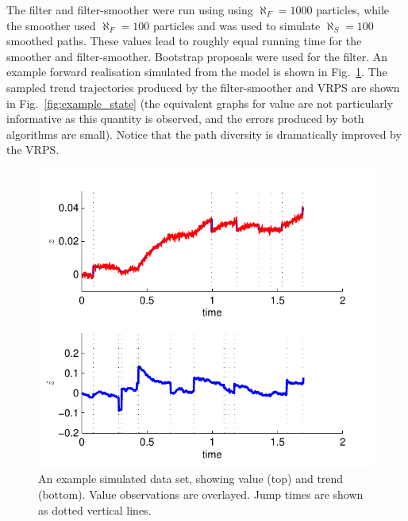 \documentclass[10pt,twocolumn,twoside]{IEEEtran}
\begin{document}
The filter and filter-smoother were run using using $\aleph_F = 1000$ particles, while the smoother used $\aleph_F = 100$ particles and was used to simulate $\aleph_S = 100$ smoothed paths. These values lead to roughly equal running time for the smoother and filter-smoother. Bootstrap proposals were used for the filter. An example forward realisation simulated from the model is shown in Fig.~\ref{fig:example_data}. The sampled trend trajectories produced by the filter-smoother and VRPS are shown in Fig.~\ref{fig:example_state} (the equivalent graphs for value are not particularly informative as this quantity is observed, and the errors produced by both algorithms are small). Notice that the path diversity is dramatically improved by the VRPS.
%
\begin{figure}[!t]
\centering
\includegraphics[width=0.9\columnwidth]{example_data.pdf}
\caption{An example simulated data set, showing value (top) and trend (bottom). Value observations are overlayed. Jump times are shown as dotted vertical lines.}
\label{fig:example_data}
\end{figure}
%
\end{document}
